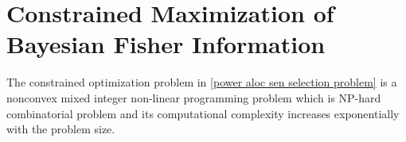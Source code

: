 \documentclass[conference]{IEEEtran}
\begin{document}
\section{Constrained Maximization of Bayesian Fisher Information} \label{Power Allocation} 
%
%
The constrained optimization problem in \eqref{power aloc sen selection problem} is a nonconvex mixed integer non-linear programming problem which is NP-hard combinatorial problem and its computational complexity
increases exponentially with the problem size. 
\end{document}

